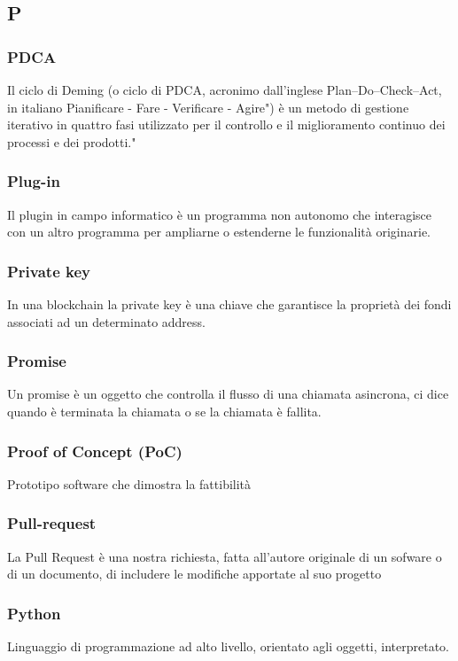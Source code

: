 \subsection*{\textbf{\hfill \Huge{P} \hfill}} 
\subsubsection*{PDCA}
Il ciclo di Deming (o ciclo di PDCA, acronimo dall'inglese Plan–Do–Check–Act, in italiano Pianificare - Fare - Verificare - Agire") è un metodo di gestione iterativo in quattro fasi utilizzato per il controllo e il miglioramento continuo dei processi e dei prodotti."
\subsubsection*{Plug-in}
Il plugin in campo informatico è un programma non autonomo che interagisce con un altro programma per ampliarne o estenderne le funzionalità originarie.
\subsubsection*{Private key}
In una blockchain la private key è una chiave che garantisce la proprietà dei fondi associati ad un determinato address.
\subsubsection*{Promise}
Un promise è un oggetto che controlla il flusso di una chiamata asincrona, ci dice quando è terminata la chiamata o se la chiamata è fallita.
\subsubsection*{Proof of Concept (PoC)}
Prototipo software che dimostra la fattibilità 
\subsubsection*{Pull-request}
La Pull Request è una nostra richiesta, fatta all’autore originale di un sofware o di un documento, di includere le modifiche apportate al suo progetto
\subsubsection*{Python}
Linguaggio di programmazione ad alto livello, orientato agli oggetti, interpretato.
